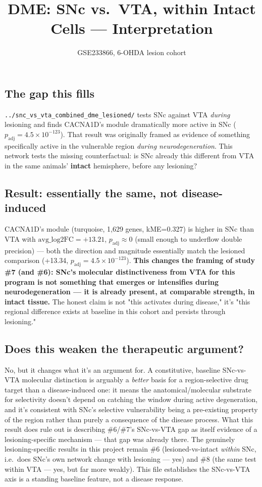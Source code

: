 \documentclass[11pt]{article}
\title{DME: SNc vs.\ VTA, within Intact Cells --- Interpretation}
\author{GSE233866, 6-OHDA lesion cohort}
\date{}
\begin{document}
\maketitle

\subsection*{The gap this fills}

\texttt{../snc\_vs\_vta\_combined\_dme\_lesioned/} tests SNc against VTA \emph{during}
lesioning and finds CACNA1D's module dramatically more active in SNc
($p_{\mathrm{adj}}=4.5\times10^{-123}$). That result was originally framed as evidence of
something specifically active in the vulnerable region \emph{during neurodegeneration}. This
network tests the missing counterfactual: is SNc already this different from VTA in the same
animals' \textbf{intact} hemisphere, before any lesioning?

\subsection*{Result: essentially the same, not disease-induced}

CACNA1D's module (turquoise, 1{,}629 genes, kME=0.327) is higher in SNc than VTA with
$\mathrm{avg\_log2FC}=+13.21$, $p_{\mathrm{adj}}\approx0$ (small enough to underflow double
precision) --- both the direction and magnitude essentially match the lesioned comparison
(+13.34, $p_{\mathrm{adj}}=4.5\times10^{-123}$). \textbf{This changes the framing of study \#7
(and \#6): SNc's molecular distinctiveness from VTA for this program is not something that
emerges or intensifies during neurodegeneration --- it is already present, at comparable
strength, in intact tissue.} The honest claim is not "this activates during disease," it's
"this regional difference exists at baseline in this cohort and persists through lesioning."

\subsection*{Does this weaken the therapeutic argument?}

No, but it changes what it's an argument for. A constitutive, baseline SNc-vs-VTA molecular
distinction is arguably a \emph{better} basis for a region-selective drug target than a
disease-induced one: it means the anatomical/molecular substrate for selectivity doesn't
depend on catching the window during active degeneration, and it's consistent with SNc's
selective vulnerability being a pre-existing property of the region rather than purely a
consequence of the disease process. What this result does rule out is describing \#6/\#7's
SNc-vs-VTA gap as itself evidence of a lesioning-specific mechanism --- that gap was already
there. The genuinely lesioning-specific results in this project remain \#6
(lesioned-vs-intact \emph{within} SNc, i.e.\ does SNc's own network change with lesioning ---
yes) and \#8 (the same test within VTA --- yes, but far more weakly). This file establishes
the SNc-vs-VTA axis is a standing baseline feature, not a disease response.
\end{document}
